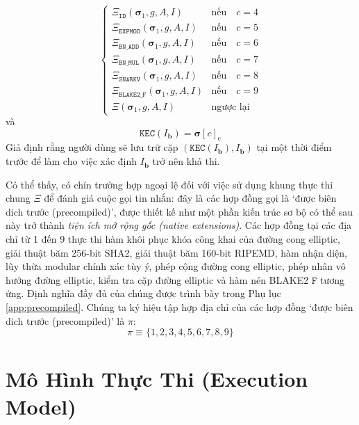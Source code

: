 \documentclass[9pt,oneside]{amsart}
\begin{document}
\begin{multicols}{2}
\begin{equation}
\begin{cases}
\Xi_{\mathtt{ID}}       (\boldsymbol{\sigma}_1, g, A, I) & \text{nếu} \quad c = 4 \\
\Xi_{\mathtt{EXPMOD}}   (\boldsymbol{\sigma}_1, g, A, I) & \text{nếu} \quad c = 5 \\
\Xi_{\mathtt{BN\_ADD}}  (\boldsymbol{\sigma}_1, g, A, I) & \text{nếu} \quad c = 6 \\
\Xi_{\mathtt{BN\_MUL}}  (\boldsymbol{\sigma}_1, g, A, I) & \text{nếu} \quad c = 7 \\
\Xi_{\mathtt{SNARKV}}   (\boldsymbol{\sigma}_1, g, A, I) & \text{nếu} \quad c = 8 \\
\Xi_{\mathtt{BLAKE2\_F}}(\boldsymbol{\sigma}_1, g, A, I) & \text{nếu} \quad c = 9 \\
\Xi                     (\boldsymbol{\sigma}_1, g, A, I) & \text{ngược lại} \end{cases}
\end{equation}
và
\begin{equation}
\mathtt{KEC}(I_{\mathbf{b}}) = \boldsymbol{\sigma}[c]_{\mathrm{c}}
\end{equation}
Giả định rằng người dùng sẽ lưu trữ cặp $(\mathtt{KEC}(I_{\mathbf{b}}), I_{\mathbf{b}})$ tại một thời điểm trước để làm cho việc xác định $I_{\mathbf{b}}$ trở nên khả thi.

Có thể thấy, có chín trường hợp ngoại lệ đối với việc sử dụng khung thực thi chung $\Xi$ để đánh giá cuộc gọi tin nhắn: đây là các hợp đồng gọi là `được biên dich trước (precompiled)', được thiết kế như một phần kiến trúc sơ bộ có thể sau này trở thành \textit{tiện ích mở rộng gốc (native extensions)}.
Các hợp đồng tại các địa chỉ từ 1 đến 9 thực thi hàm khôi phục khóa công khai của đường cong elliptic, giải thuật băm 256-bit SHA2, giải thuật băm 160-bit RIPEMD, hàm nhận diện, lũy thừa modular chính xác tùy ý, phép cộng đường cong elliptic, phép nhân vô hướng đường elliptic, kiểm tra cặp đường elliptic và hàm nén BLAKE2 $\mathtt{F}$ tương ứng.
Định nghĩa đầy đủ của chúng được trình bày trong Phụ lục \ref{app:precompiled}.
\hypertarget{precompiled_set}{}Chúng ta ký hiệu tập hợp địa chỉ của các hợp đồng `được biên dich trước (precompiled)' là $\pi$:
\begin{equation}
\pi \equiv \{1, 2, 3, 4, 5, 6, 7, 8, 9 \}
\end{equation}

\section{Mô Hình Thực Thi (Execution Model)} \label{ch:model}


\end{multicols}
\end{document}
